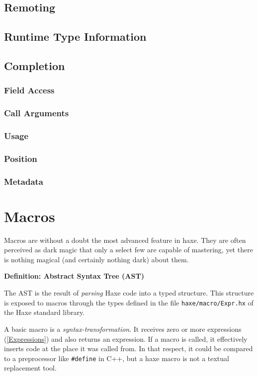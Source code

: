 \documentclass{article}
\newcommand{\expr}[1]{\texttt{#1}}
\newenvironment{myshaded}
  {\def\FrameCommand{\fboxsep=\topsep\colorbox{bgcolor}}%
  \MakeFramed {\advance\hsize-\width \FrameRestore}}%
 {\endMakeFramed}
\newcommand{\define}[3][Definition]
	{\begin{myshaded}\noindent\textbf{#1: #2}\par\nobreak\noindent\ignorespaces#3\label{def:#2}\end{myshaded}}
\newcommand{\tref}[2]{#1 (\ref{#2})}
\begin{document}
\subsection{Remoting}

\subsection{Runtime Type Information}


\subsection{Completion}

\subsubsection{Field Access}
\subsubsection{Call Arguments}
\subsubsection{Usage}
\subsubsection{Position}
\subsubsection{Metadata}




\section{Macros}
\label{Macros}

Macros are without a doubt the most advanced feature in haxe. They are often perceived as dark magic that only a select few are capable of mastering, yet there is nothing magical (and certainly nothing dark) about them.

\define{Abstract Syntax Tree (AST)}{The AST is the result of \emph{parsing} Haxe code into a typed structure. This structure is exposed to macros through the types defined in the file \expr{haxe/macro/Expr.hx} of the Haxe standard library.}

A basic macro is a \emph{syntax-transformation}. It receives zero or more \tref{expressions}{Expressions} and also returns an expression. If a macro is called, it effectively inserts code at the place it was called from. In that respect, it could be compared to a preprocessor like \expr{\#define} in C++, but a haxe macro is not a textual replacement tool.
\end{document}
